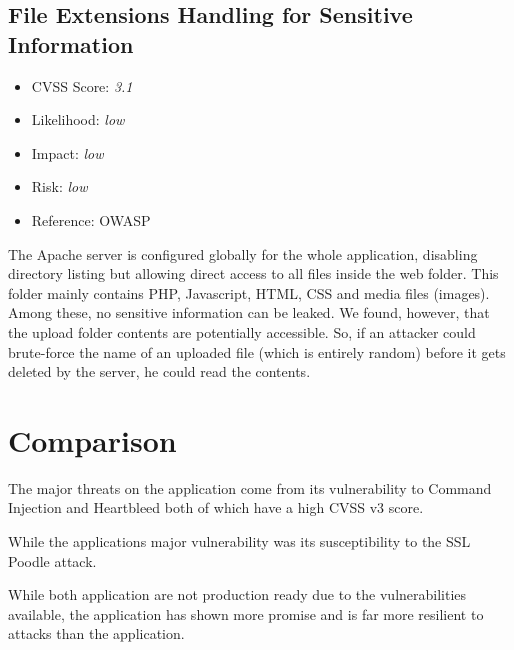 \subsection{File Extensions Handling for Sensitive Information} \label{over:vuln_12}
\begin{itemize}
	\item CVSS Score: \textit{3.1}
	\item Likelihood: \textit{low}
	\item Impact: \textit{low}
	\item Risk: \textit{low}
	\item Reference: OWASP 
\end{itemize}
The Apache server is configured globally for the whole application, disabling directory listing but allowing direct access to all files inside the web folder. This folder mainly contains PHP, Javascript, HTML, CSS and media files (images). Among these, no sensitive information can be leaked. We found, however, that the upload folder contents are potentially accessible. So, if an attacker could brute-force the name of an uploaded file (which is entirely random) before it gets deleted by the server, he could read the contents.	

\section{Comparison}
The major threats on the \bs{} application come from its vulnerability to Command Injection and Heartbleed both of which have a high CVSS v3 score.

While the \gnb{} applications major vulnerability was its susceptibility to the SSL Poodle attack.

While both application are not production ready due to the vulnerabilities available,  the \gnb{} application has shown more promise and is far more resilient to attacks than the \bs{} application.

